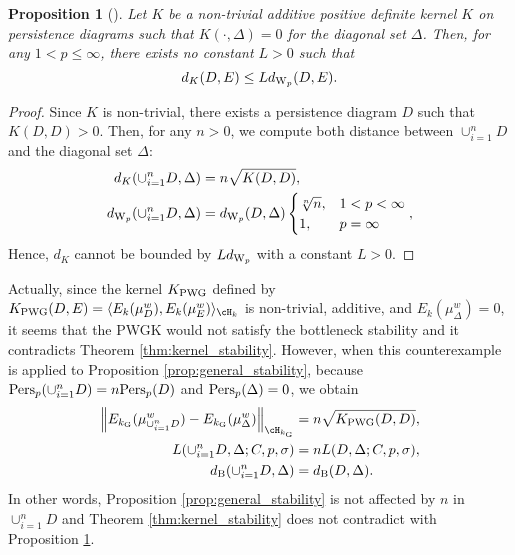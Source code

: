 \documentclass{article}
\newtheorem{prop}[thm]{Proposition}
\newcommand{\DD}{{\Delta}}
\newcommand{\Pers}{{\rm Pers}}
\providecommand{\norm}[1]{\left\lVert#1\right\rVert}
\providecommand{\inn}[2]{\langle #1, #2 \rangle}
\providecommand{\dk}[4]{\norm{E_{#1}(\mu^{#2}_{#3}) - E_{#1}(\mu^{#2}_{#4})}_{\cH_{#1}}}
\begin{document}
\begin{prop}[\cite{RHBK15}]
\label{prop:additive}
Let $K$ be a non-trivial additive positive definite kernel $K$ on persistence diagrams such that $K(\cdot, \DD) =0$ for the diagonal set $\DD$.
Then, for any $1 < p \leq \infty$, there exists no constant $L>0$ such that
\[
d_{K}(D,E) \leq L d_{ {\rm W}_{p}}(D,E).
\]
\end{prop}

\begin{proof}
Since $K$ is non-trivial, there exists a persistence diagram $D$ such that $K(D,D) > 0$.
Then, for any $n>0$, we compute both distance between $\cup^{n}_{i =1}D$ and the diagonal set $\DD$:
\begin{align*}
d_{K}(\cup^{n}_{i =1}D, \DD)&=n \sqrt{K(D,D)}, \\
d_{ {\rm W}_{p}}(\cup^{n}_{i =1}D, \DD)&=d_{ {\rm W}_{p}}(D,\DD)
\begin{cases}
\sqrt[n]{n}, & 1 < p < \infty \\
1, & p = \infty
\end{cases},
\end{align*}
Hence, $d_{K}$ cannot be bounded by $L d_{ {\rm W}_{p}}$ with a constant $L>0$.
\end{proof}

Actually, since the kernel $K_{{\rm PWG}}$ defined by $K_{{\rm PWG}}(D, E)=\inn{E_{k}(\mu^{w}_{D})}{E_{k}(\mu^{w}_{E})}_{\cH_{k}}$ is non-trivial, additive, and $E_{k}(\mu^{w}_{\DD})=0$, it seems that the PWGK would not satisfy the bottleneck stability and it contradicts Theorem \ref{thm:kernel_stability}.
However, when this counterexample is applied to Proposition \ref{prop:general_stability}, 
because $\Pers_{p}(\cup^{n}_{i =1}D) = n \Pers_{p}(D)$ and $\Pers_{p}(\DD) = 0$, we obtain
\begin{align*}
\dk{k_{{\rm G}}}{w}{\cup^{n}_{i =1}D}{\DD} 
&= n \sqrt{K_{{\rm PWG}}(D,D)}, \\
L(\cup^{n}_{i =1}D,\DD;C,p,\sigma)
&=nL(D,\DD;C,p,\sigma), \\
d_{{\rm B}}(\cup^{n}_{i =1}D, \DD) 
&= d_{{\rm B}}(D, \DD). 
\end{align*}
In other words, Proposition \ref{prop:general_stability} is not affected by $n$ in $\cup^{n}_{i =1}D$ and Theorem \ref{thm:kernel_stability} does not contradict with Proposition \ref{prop:additive}.

\newpage



\end{document}
